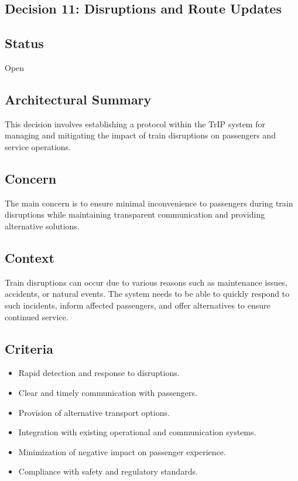 \subsection{Decision 11: Disruptions and Route Updates}

\subsection*{Status}
Open

\subsection*{Architectural Summary}
This decision involves establishing a protocol within the TrIP system for managing and mitigating the impact of train disruptions on passengers and service operations.

\subsection*{Concern}
The main concern is to ensure minimal inconvenience to passengers during train disruptions while maintaining transparent communication and providing alternative solutions.

\subsection*{Context}
Train disruptions can occur due to various reasons such as maintenance issues, accidents, or natural events. The system needs to be able to quickly respond to such incidents, inform affected passengers, and offer alternatives to ensure continued service.

\subsection*{Criteria}
\begin{itemize}
    \item Rapid detection and response to disruptions.
    \item Clear and timely communication with passengers.
    \item Provision of alternative transport options.
    \item Integration with existing operational and communication systems.
    \item Minimization of negative impact on passenger experience.
    \item Compliance with safety and regulatory standards.
\end{itemize}

